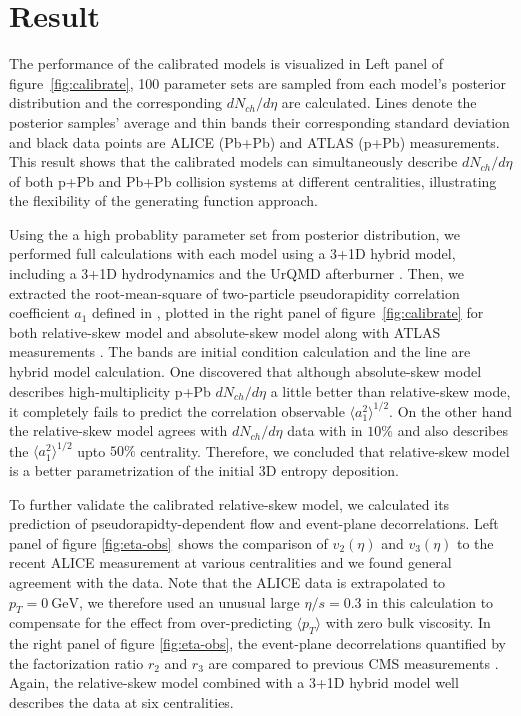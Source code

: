 \documentclass[3p,times,twocolumn]{elsarticle}
\begin{document}
\section{Result}
\label{Result}
The performance of the calibrated models is visualized in Left panel of figure~\ref{fig:calibrate}, 100 parameter sets are sampled from each model's posterior distribution and the corresponding $dN_{ch}/d\eta$ are calculated.
Lines denote the posterior samples' average and thin bands their corresponding standard deviation and black data points are ALICE (Pb+Pb) \cite{Abbas:2013bpa, ALICE:2015kda} and ATLAS (p+Pb) \cite{Aad:2015zza} measurements.
This result shows that the calibrated models can simultaneously describe $dN_{ch}/d\eta$ of both p+Pb and Pb+Pb collision systems at different centralities, illustrating the flexibility of the generating function approach.

Using the a high probablity parameter set from posterior distribution, we performed full calculations with each model using a 3+1D hybrid model, including a 3+1D hydrodynamics \cite{Karpenko:2013wva} and the UrQMD afterburner \cite{Bass:1998ca, Bleicher:1999xi}.
Then, we extracted the root-mean-square of two-particle pseudorapidity correlation coefficient $a_1$ defined in \cite{Bzdak:2012tp}, plotted in the right panel of figure~\ref{fig:calibrate} for both relative-skew model and absolute-skew model along with ATLAS measurements \cite{ATLAS:2015kla}. 
The bands are initial condition calculation and the line are hybrid model calculation.
One discovered that although absolute-skew model describes high-multiplicity p+Pb $dN_{ch}/d\eta$ a little better than relative-skew mode, it completely fails to predict the correlation observable $\langle a_1^2\rangle^{1/2}$.
On the other hand the relative-skew model agrees with $dN_{ch}/d\eta$ data with in $10\%$ and also describes the $\langle a_1^2\rangle^{1/2}$ upto $50\%$ centrality.
Therefore, we concluded that relative-skew model is a better parametrization of the initial 3D entropy deposition. 

To further validate the calibrated relative-skew model, we calculated its prediction of pseudorapidty-dependent flow and event-plane decorrelations.
Left panel of figure \ref{fig:eta-obs}~shows the comparison of $v_2(\eta)$ and $v_3(\eta)$ to the recent ALICE measurement \cite{Adam:2016ows} at various centralities and we found general agreement with the data.
Note that the ALICE data is extrapolated to $p_T = 0~\textrm{GeV}$, we therefore used an unusual large $\eta/s=0.3$ in this calculation to compensate for the effect from over-predicting $\langle p_T\rangle$ with zero bulk viscosity.
In the right panel of figure \ref{fig:eta-obs}, the event-plane decorrelations quantified by the factorization ratio $r_2$ and $r_3$ are compared to previous CMS measurements \cite{Khachatryan:2015oea}.
Again, the relative-skew model combined with a 3+1D hybrid model well describes the data at six centralities.
\end{document}
